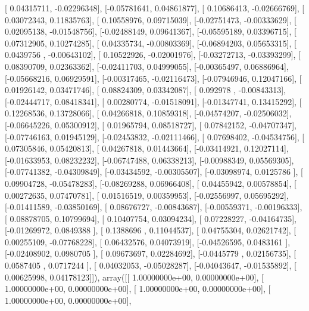 \documentclass{article}
\begin{document}
       [ 0.04315711, -0.02296348],
       [-0.05781641,  0.04861877],
       [ 0.10686413, -0.02666769],
       [ 0.03072343,  0.11835763],
       [ 0.10558976,  0.09715039],
       [-0.02751473, -0.00333629],
       [ 0.02095138, -0.01548756],
       [-0.02488149,  0.09641367],
       [-0.05595189,  0.03396715],
       [ 0.07312905,  0.10274285],
       [ 0.04335734, -0.00803369],
       [-0.06894203,  0.05653315],
       [ 0.0439756 , -0.00643102],
       [ 0.10522926, -0.02001976],
       [-0.03272713, -0.03393299],
       [ 0.08390709,  0.02363362],
       [-0.02411703,  0.04999055],
       [-0.00365497,  0.06886964],
       [-0.05668216,  0.06929591],
       [-0.00317465, -0.02116473],
       [-0.07946946,  0.12047166],
       [ 0.01926142,  0.03471746],
       [ 0.08824309,  0.03342087],
       [ 0.092978  , -0.00843313],
       [-0.02444717,  0.08418341],
       [ 0.00280774, -0.01518091],
       [-0.01347741,  0.13415292],
       [ 0.12268536,  0.13728066],
       [ 0.04266818,  0.10859318],
       [-0.04574207, -0.02506032],
       [-0.06645226,  0.05300912],
       [ 0.01965794,  0.08518727],
       [ 0.07842152, -0.04707347],
       [-0.07746163,  0.01945129],
       [-0.02453832, -0.02111466],
       [ 0.07698402, -0.04534756],
       [ 0.07305846,  0.05420813],
       [ 0.04267818,  0.01443664],
       [-0.03414921,  0.12027114],
       [-0.01633953,  0.08232232],
       [-0.06747488,  0.06338213],
       [-0.00988349,  0.05569305],
       [-0.07741382, -0.04309849],
       [-0.03434592, -0.00305507],
       [-0.03098974,  0.0125786 ],
       [ 0.09904728, -0.05478283],
       [-0.08269288,  0.06966408],
       [ 0.04455942,  0.00578854],
       [ 0.00272635,  0.07470781],
       [ 0.01516519,  0.00359953],
       [-0.02556997,  0.05695292],
       [-0.01411589, -0.03850169],
       [ 0.08676727, -0.00843687],
       [-0.00559371, -0.00196333],
       [ 0.08878705,  0.10799694],
       [ 0.10407754,  0.03094234],
       [ 0.07228227, -0.04164735],
       [-0.01269972,  0.0849388 ],
       [ 0.1388696 ,  0.11044537],
       [ 0.04755304,  0.02621742],
       [ 0.00255109, -0.07768228],
       [ 0.06432576,  0.04073919],
       [-0.04526595,  0.0483161 ],
       [-0.02408902,  0.0980705 ],
       [ 0.09673697,  0.02284692],
       [-0.0445779 ,  0.02156735],
       [ 0.0587405 ,  0.0717244 ],
       [ 0.04032053, -0.05028287],
       [-0.04043647, -0.01535892],
       [ 0.00625998,  0.04178123]]), array([[  1.00000000e+00,   0.00000000e+00],
       [  1.00000000e+00,   0.00000000e+00],
       [  1.00000000e+00,   0.00000000e+00],
       [  1.00000000e+00,   0.00000000e+00],
\end{document}
